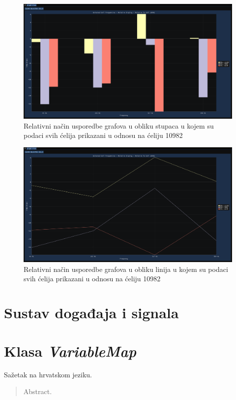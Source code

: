 \documentclass[times, utf8, diplomski]{fer}
\begin{document}
\begin{figure}[H]
	\centering
	\includegraphics[width=\textwidth]{relative_graph_display_bars_cell_10982.png}
	\caption{Relativni način usporedbe grafova u obliku stupaca u kojem su podaci svih ćelija prikazani u odnosu na ćeliju 10982}
    \label{appendix:relative_graph_display_bars}
\end{figure}

\begin{figure}[H]
	\centering
	\includegraphics[width=\textwidth]{relative_graph_display_lines_cell_10982.png}
	\caption{Relativni način usporedbe grafova u obliku linija u kojem su podaci svih ćelija prikazani u odnosu na ćeliju 10982}
    \label{appendix:relative_graph_display_lines}
\end{figure}

\chapter{Sustav događaja i signala} \label{appendix:event-signal-system}

\chapter{Klasa \textit{VariableMap}} \label{appendix:variablemap-class}

\begin{sazetak}
Sažetak na hrvatskom jeziku.

\end{sazetak}

\begin{abstract}
Abstract.

\end{abstract}
\end{document}
